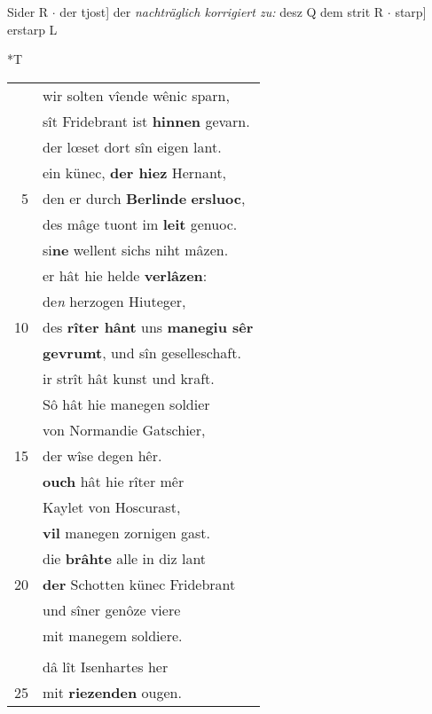\documentclass[8pt,a4paper,notitlepage]{article}
\begin{document}
\begin{table}[ht]
\begin{minipage}[t]{0.5\linewidth}
Sider R  $\cdot$ der tjost] der \textit{nachträglich korrigiert zu:} desz Q dem strit R  $\cdot$ starp] erstarp L \newline
\end{minipage}
\hspace{0.5cm}
\begin{minipage}[t]{0.5\linewidth}
\small
\begin{center}*T
\end{center}
\begin{tabular}{rl}
 & wir solten vîende wênic sparn,\\ 
 & sît Fridebrant ist \textbf{hinnen} gevarn.\\ 
 & der lœset dort sîn eigen lant.\\ 
 & ein künec, \textbf{der hiez} Hernant,\\ 
5 & den er durch \textbf{Berlinde} \textbf{ersluoc},\\ 
 & des mâge tuont im \textbf{leit} genuoc.\\ 
 & si\textbf{ne} wellent sichs niht mâzen.\\ 
 & er hât hie helde \textbf{verlâzen}:\\ 
 & de\textit{n} herzogen Hiuteger,\\ 
10 & des \textbf{rîter hânt} uns \textbf{manegiu sêr}\\ 
 & \textbf{gevrumt}, und sîn geselleschaft.\\ 
 & ir strît hât kunst und kraft.\\ 
 & Sô hât hie manegen soldier\\ 
 & von Normandie Gatschier,\\ 
15 & der wîse degen hêr.\\ 
 & \textbf{ouch} hât hie rîter mêr\\ 
 & Kaylet von Hoscurast,\\ 
 & \textbf{vil} manegen zornigen gast.\\ 
 & die \textbf{brâhte} alle in diz lant\\ 
20 & \textbf{der} Schotten künec Fridebrant\\ 
 & und sîner genôze viere\\ 
 & mit manegem soldiere.\\ 
 & \textbf{\begin{large}D\end{large}ort westerhalp} an dem mer,\\ 
 & dâ lît Isenhartes her\\ 
25 & mit \textbf{riezenden} ougen.\\ 

\end{tabular}
\end{minipage}
\end{table}
\end{document}
